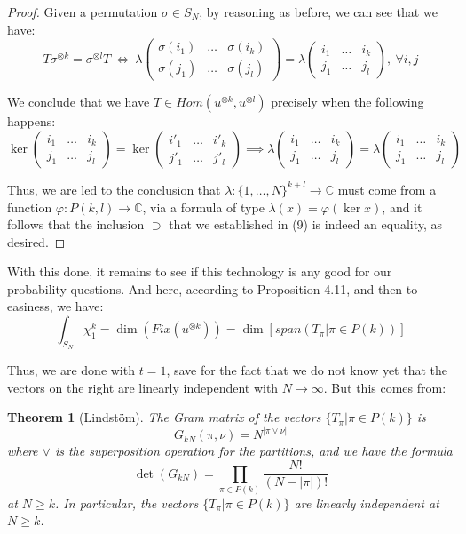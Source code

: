 \documentclass[12pt]{amsbook}
\newtheorem{theorem}{Theorem}[chapter]
\begin{document}
\begin{proof}
Given a permutation $\sigma\in S_N$, by reasoning as before, we can see that we have:
$$T\sigma^{\otimes k}=\sigma^{\otimes l}T
\ \iff\ \lambda\begin{pmatrix}\sigma(i_1)&\ldots&\sigma(i_k)\\ \sigma(j_1)&\ldots&\sigma(j_l)\end{pmatrix}=\lambda\begin{pmatrix}i_1&\ldots& i_k\\ j_1&\ldots& j_l\end{pmatrix},\ \forall i,j$$

We conclude that we have $T\in Hom(u^{\otimes k},u^{\otimes l})$ precisely when the following happens:
$$\ker\begin{pmatrix}i_1&\ldots& i_k\\ j_1&\ldots& j_l\end{pmatrix}
=\ker\begin{pmatrix}i'_1&\ldots& i'_k\\ j'_1&\ldots& j'_l\end{pmatrix}\implies
\lambda\begin{pmatrix}i_1&\ldots& i_k\\ j_1&\ldots& j_l\end{pmatrix}
=\lambda\begin{pmatrix}i_1&\ldots& i_k\\ j_1&\ldots& j_l\end{pmatrix}$$

Thus, we are led to the conclusion that $\lambda:\{1,\ldots,N\}^{k+l}\to\mathbb C$ must come from a function $\varphi:P(k,l)\to\mathbb C$, via a formula of type $\lambda(x)=\varphi(\ker x)$, and it follows that the inclusion $\supset$ that we established in (9) is indeed an equality, as desired.
\end{proof}

With this done, it remains to see if this technology is any good for our probability questions. And here, according to Proposition 4.11, and then to easiness, we have:
$$\int_{S_N}\chi_1^k=\dim\left(Fix(u^{\otimes k})\right)
=\dim\left[span\left(T_\pi\Big|\pi\in P(k)\right)\right]$$

Thus, we are done with $t=1$, save for the fact that we do not know yet that the vectors on the right are linearly independent with $N\to\infty$. But this comes from:


\begin{theorem}[Lindst\"om]
The Gram matrix of the vectors $\{T_\pi|\pi\in P(k)\}$ is
$$G_{kN}(\pi,\nu)=N^{|\pi\vee\nu|}$$
where $\vee$ is the superposition operation for the partitions, and we have the formula
$$\det(G_{kN})=\prod_{\pi\in P(k)}\frac{N!}{(N-|\pi|)!}$$
at $N\geq k$. In particular, the vectors $\{T_\pi|\pi\in P(k)\}$ are linearly independent at $N\geq k$.
\end{theorem}
\end{document}
